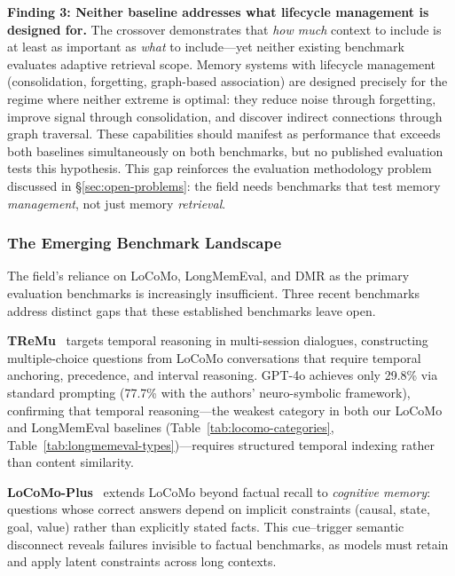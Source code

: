 \smallskip
\noindent\textbf{Finding 3: Neither baseline addresses what lifecycle
management is designed for.}\enspace
The crossover demonstrates that \emph{how much} context to include is at
least as important as \emph{what} to include---yet neither existing benchmark
evaluates adaptive retrieval scope.  Memory systems with lifecycle
management (consolidation, forgetting, graph-based association) are designed
precisely for the regime where neither extreme is optimal: they reduce noise
through forgetting, improve signal through consolidation, and discover
indirect connections through graph traversal.  These capabilities should
manifest as performance that exceeds both baselines simultaneously on both
benchmarks, but no published evaluation tests this hypothesis.  This gap
reinforces the evaluation methodology problem discussed in
\S\ref{sec:open-problems}: the field needs benchmarks that test memory
\emph{management}, not just memory \emph{retrieval}.

\subsubsection{The Emerging Benchmark Landscape}
\label{sec:benchmark-landscape}

The field's reliance on LoCoMo, LongMemEval, and DMR as the primary
evaluation benchmarks is increasingly insufficient. Three recent benchmarks
address distinct gaps that these established benchmarks leave open.

\textbf{TReMu}~\cite{ge2025tremu} targets temporal reasoning in
multi-session dialogues, constructing multiple-choice questions from
LoCoMo conversations that require temporal anchoring, precedence, and
interval reasoning.  GPT-4o achieves only 29.8\% via standard prompting
(77.7\% with the authors' neuro-symbolic framework), confirming that
temporal reasoning---the weakest category in both our LoCoMo and
LongMemEval baselines (Table~\ref{tab:locomo-categories},
Table~\ref{tab:longmemeval-types})---requires structured temporal
indexing rather than content similarity.

\textbf{LoCoMo-Plus}~\cite{li2026locomoplus} extends LoCoMo beyond
factual recall to \emph{cognitive memory}: questions whose correct
answers depend on implicit constraints (causal, state, goal, value)
rather than explicitly stated facts.  This cue--trigger semantic
disconnect reveals failures invisible to factual benchmarks, as models
must retain and apply latent constraints across long contexts.

